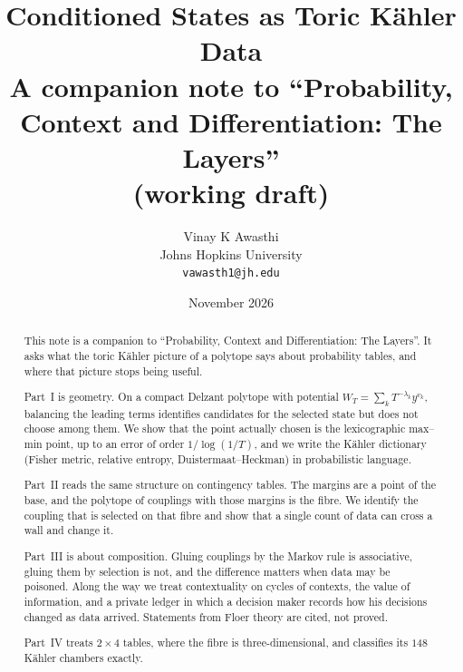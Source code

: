 \documentclass[11pt]{article}
\title{Conditioned States as Toric K\"ahler Data\\[2pt]\large A companion note to ``Probability, Context and Differentiation: The Layers''\\ \normalsize (working draft)}
\author{Vinay K Awasthi\\ Johns Hopkins University\\ \texttt{vawasth1@jh.edu}}
\date{November 2026}
\theoremstyle{definition}\newtheorem{definition}[theorem]{Definition}\newtheorem{remark}[theorem]{Remark}\newtheorem{example}[theorem]{Example}\newtheorem{problem}[theorem]{Open problem}\crefname{problem}{Problem}{Problems}
\begin{document}
\maketitle

\begin{abstract}
This note is a companion to ``Probability, Context and Differentiation: The Layers''. It asks what the toric K\"ahler picture of a polytope says about probability tables, and where that picture stops being useful.

Part~I is geometry. On a compact Delzant polytope with potential $W_T=\sum_kT^{-\lambda_k}y^{v_k}$, balancing the leading terms identifies candidates for the selected state but does not choose among them. We show that the point actually chosen is the lexicographic max--min point, up to an error of order $1/\log(1/T)$, and we write the K\"ahler dictionary (Fisher metric, relative entropy, Duistermaat--Heckman) in probabilistic language.

Part~II reads the same structure on contingency tables. The margins are a point of the base, and the polytope of couplings with those margins is the fibre. We identify the coupling that is selected on that fibre and show that a single count of data can cross a wall and change it.

Part~III is about composition. Gluing couplings by the Markov rule is associative, gluing them by selection is not, and the difference matters when data may be poisoned. Along the way we treat contextuality on cycles of contexts, the value of information, and a private ledger in which a decision maker records how his decisions changed as data arrived. Statements from Floer theory are cited, not proved.

Part~IV treats $2\times4$ tables, where the fibre is three-dimensional, and classifies its $148$ K\"ahler chambers exactly.


\end{abstract}
\end{document}

